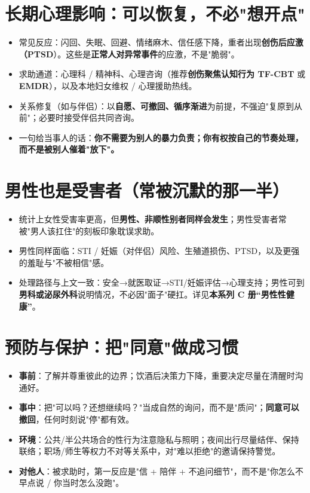 \section{长期心理影响：可以恢复，不必"想开点"}
\begin{itemize}
  \item 常见反应：闪回、失眠、回避、情绪麻木、信任感下降，重者出现\textbf{创伤后应激（PTSD}）。这些是\textbf{正常人对异常事件}的应激，不是"脆弱"。
  \item 求助通道：心理科 / 精神科、心理咨询（推荐\textbf{创伤聚焦认知行为 TF-CBT} 或\textbf{EMDR}），以及本地妇女维权 / 心理援助热线。
  \item 关系修复（如与伴侣）：以\textbf{自愿、可撤回、循序渐进}为前提，不强迫"复原到从前"；必要时接受伴侣共同咨询。
  \item 一句给当事人的话：\textbf{你不需要为别人的暴力负责；你有权按自己的节奏处理，而不是被别人催着"放下"。}
\end{itemize}

\section{男性也是受害者（常被沉默的那一半）}
\begin{itemize}
  \item 统计上女性受害率更高，但\textbf{男性、非顺性别者同样会发生}；男性受害者常被"男人该扛住"的刻板印象耽误求助。
  \item 男性同样面临：STI / 妊娠（对伴侣）风险、生殖道损伤、PTSD，以及更强的羞耻与"不被相信"感。
  \item 处理路径与上文一致：安全→就医取证→STI/妊娠评估→心理支持；男性可到\textbf{男科或泌尿外科}说明情况，不必因"面子"硬扛。详见\textbf{本系列 C 册“男性性健康”}。
\end{itemize}

\section{预防与保护：把"同意"做成习惯}
\begin{itemize}
  \item \textbf{事前}：了解并尊重彼此的边界；饮酒后决策力下降，重要决定尽量在清醒时沟通好。
  \item \textbf{事中}：把"可以吗？还想继续吗？"当成自然的询问，而不是"质问"；\textbf{同意可以撤回}，任何时刻说"停"都有效。
  \item \textbf{环境}：公共/半公共场合的性行为注意隐私与照明；夜间出行尽量结伴、保持联络；职场/师生等权力不对等关系中，对"难以拒绝"的邀请保持警觉。
  \item \textbf{对他人}：被求助时，第一反应是"信 + 陪伴 + 不追问细节"，而不是"你怎么不早点说 / 你当时怎么没跑"。
\end{itemize}

